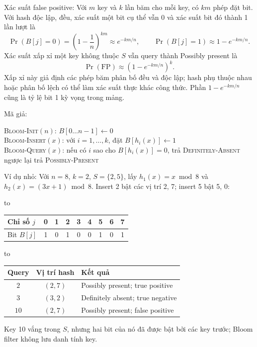 \documentclass[10pt,a4paper,twocolumn]{article}
\makeatletter
\newcommand{\key}[1]{#1:\enspace}
\newenvironment{examtable}[1]{%
  \par\addvspace{2pt}\noindent\hbox to \linewidth\bgroup\hfil
  \setlength{\tabcolsep}{4pt}%
  \renewcommand{\arraystretch}{1.12}\begin{tabular}{#1}%
}{\end{tabular}\hfil\egroup\par\addvspace{2pt}}
\newenvironment{algpseudo}{%
  \par\addvspace{2pt}\noindent
  \setlength{\parskip}{0pt}%
  Mã giả:\par\nobreak
  \begin{list}{}{\setlength{\leftmargin}{1em}\setlength{\topsep}{0pt}%
    \setlength{\partopsep}{0pt}\setlength{\parsep}{0pt}%
    \@beginparpenalty=10000\relax}%
  \item\relax
}{\end{list}\par\addvspace{3pt}}
\makeatother
\begin{document}
\key{Xác suất false positive} Với $m$ key và $k$ lần băm cho mỗi key, có $km$ phép đặt bit. Với hash độc lập, đều, xác suất một bit cụ thể vẫn 0 và xác suất bit đó thành 1 lần lượt là
\[
\Pr(B[j]=0)=\left(1-\frac1n\right)^{km}\approx e^{-km/n},
\qquad
\Pr(B[j]=1)\approx1-e^{-km/n}.
\]
Xác suất xấp xỉ một key không thuộc $S$ vẫn query thành Possibly present là
\[
\boxed{\Pr(\mathrm{FP})\approx\left(1-e^{-km/n}\right)^k}.
\]
Xấp xỉ này giả định các phép băm phân bố đều và độc lập; hash phụ thuộc nhau hoặc phân bố lệch có thể làm xác suất thực khác công thức. Phần $1-e^{-km/n}$ cũng là tỷ lệ bit 1 kỳ vọng trong mảng.

\begin{algpseudo}
\textsc{Bloom-Init}$(n)$: $B[0\ldots n-1]\gets0$\\
\textsc{Bloom-Insert}$(x)$: với $i=1,\ldots,k$, đặt $B[h_i(x)]\gets1$\\
\textsc{Bloom-Query}$(x)$: nếu có $i$ sao cho $B[h_i(x)]=0$, trả \textsc{Definitely-Absent}\\
\quad ngược lại trả \textsc{Possibly-Present}
\end{algpseudo}

\key{Ví dụ nhỏ} Với $n=8$, $k=2$, $S=\{2,5\}$, lấy $h_1(x)=x\bmod8$ và $h_2(x)=(3x+1)\bmod8$. Insert 2 bật các vị trí 2, 7; insert 5 bật 5, 0:
\begin{examtable}{@{}lcccccccc@{}}
\toprule
Chỉ số $j$ & 0 & 1 & 2 & 3 & 4 & 5 & 6 & 7\\
\midrule
Bit $B[j]$ & 1 & 0 & 1 & 0 & 0 & 1 & 0 & 1\\
\bottomrule
\end{examtable}
\begin{examtable}{@{}c c p{.46\linewidth}@{}}
\toprule
Query & Vị trí hash & Kết quả\\
\midrule
$2$ & $(2,7)$ & Possibly present; true positive\\
$3$ & $(3,2)$ & Definitely absent; true negative\\
$10$ & $(2,7)$ & Possibly present; false positive\\
\bottomrule
\end{examtable}
Key 10 vắng trong $S$, nhưng hai bit của nó đã được bật bởi các key trước; Bloom filter không lưu danh tính key.
\end{document}
